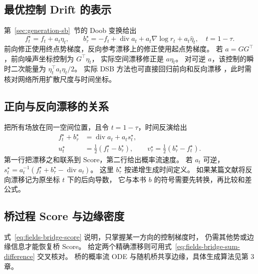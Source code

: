 \subsection{最优控制 Drift 的表示}

第~\ref{sec:generation-sb}~节的 Doob 变换给出
\begin{equation}
 f_t^\star=f_t+a_t\eta_t,\qquad
 b_\tau^\star=-f_t+\operatorname{div}a_t
                 +a_t\nabla\log r_t+a_t\widehat\eta_t,
 \quad t=1-\tau.
 \label{eq:fields-bridge-drifts}
\end{equation}
前向修正使用终点势梯度，反向参考漂移上的修正使用起点势梯度。
若 \(a=GG^\top\)，前向噪声坐标控制为 \(G^\top\eta_t\)，
实际空间漂移修正是 \(a\eta_t\)。
对可逆 \(a\)，该控制的瞬时二次能量为
\(\eta_t^\top a_t\eta_t/2\)。
实际 DSB 方法也可直接回归前向和反向漂移
\cite{debortoli2021dsb}，此时需核对网络所用扩散尺度与时间坐标。

\subsection{正向与反向漂移的关系}

把所有场放在同一空间位置，且令 \(t=1-\tau\)，时间反演给出
\begin{equation}
 \begin{aligned}
 f_t^\star+b_\tau^\star&=\operatorname{div}a_t+a_ts_t^\star,\\
 u_t^\star&=\tfrac12(f_t^\star-b_\tau^\star),\qquad
 v_\tau^\star=\tfrac12(b_\tau^\star-f_t^\star).
 \end{aligned}
 \label{eq:fields-bridge-sum-difference}
\end{equation}
第一行把漂移之和联系到 Score，第二行给出概率流速度。
若 \(a_t\) 可逆，\(s_t^\star=a_t^{-1}(f_t^\star+b_\tau^\star-\operatorname{div}a_t)\)。
这里 \(b_\tau^\star\) 按递增生成时间定义。
如果某篇文献将反向漂移记为原坐标 \(t\) 下的后向导数，
它与本书 \(b\) 的符号需要先转换，再比较和差公式。

\subsection{桥过程 Score 与边缘密度}

式~\eqref{eq:fields-bridge-score} 说明，只掌握某一方向的控制梯度时，
仍需其他势或边缘信息才能恢复桥 Score。
给定两个精确漂移则可用式~\eqref{eq:fields-bridge-sum-difference} 交叉核对。
桥的概率流 ODE 与随机桥共享边缘，具体生成算法见第 3 章。

